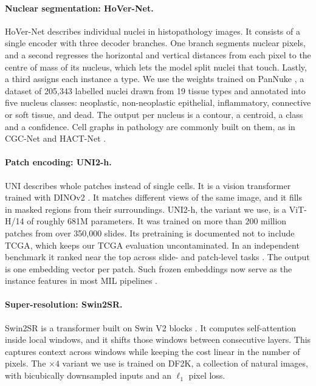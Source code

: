 \documentclass{midl} %
\begin{document}
\paragraph{Nuclear segmentation: HoVer-Net.}
HoVer-Net \citep{graham2019} describes individual nuclei in histopathology images. It consists
of a single encoder with three decoder branches. One branch segments nuclear pixels, and a
second regresses the horizontal and vertical distances from each pixel to the centre of mass of
its nucleus, which lets the model split nuclei that touch. Lastly, a third assigns each
instance a type. We use the weights trained on PanNuke \citep{gamper2020}, a dataset of 205,343
labelled nuclei drawn from 19 tissue types and annotated into five nucleus classes: neoplastic,
non-neoplastic epithelial, inflammatory, connective or soft tissue, and dead. The output per
nucleus is a contour, a centroid, a class and a confidence. Cell graphs in pathology are
commonly built on them, as in CGC-Net \citep{zhou2019} and HACT-Net \citep{pati2022}.

\paragraph{Patch encoding: UNI2-h.}
UNI \citep{chen2024} describes whole patches instead of single cells. It is a vision
transformer trained with DINOv2 \citep{oquab2024}. It matches different views of the same image, and it fills in
masked regions from their surroundings. UNI2-h, the variant we use, is a ViT-H/14 of roughly
681M parameters. It was trained on more than 200 million patches from over 350,000 slides. Its
pretraining is documented not to include TCGA, which keeps our TCGA evaluation uncontaminated.
In an independent benchmark it ranked near the top across slide- and patch-level tasks
\citep{campanella2025}. The output is one embedding vector per patch. Such frozen embeddings
now serve as the instance features in most MIL pipelines \citep{lu2021, filiot2023}.

\paragraph{Super-resolution: Swin2SR.}
Swin2SR \citep{conde2022} is a transformer built on Swin V2 blocks \citep{liu2022}. It computes
self-attention inside local windows, and it shifts those windows between consecutive layers.
This captures context across windows while keeping the cost linear in the number of pixels. The
$\times 4$ variant we use is trained on DF2K, a collection of natural images, with bicubically
downsampled inputs and an $\ell_1$ pixel loss.
\end{document}
